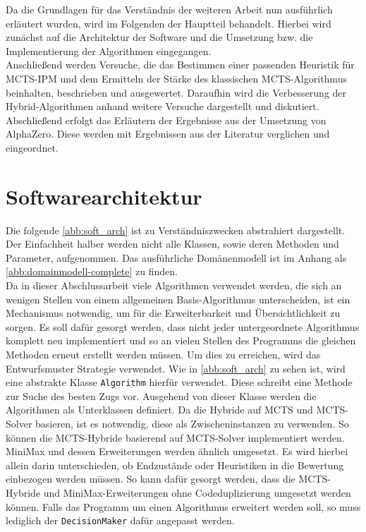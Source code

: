 \documentclass[12pt,a4paper,bibliography=totocnumbered,listof=totocnumbered]{article}
\begin{document}
Da die Grundlagen für das Verständnis der weiteren Arbeit nun ausführlich erläutert wurden, wird im Folgenden der Hauptteil behandelt. Hierbei wird zunächst auf die Architektur der Software und die Umsetzung bzw. die Implementierung der Algorithmen eingegangen.\\Anschließend werden Versuche, die das Bestimmen einer passenden Heuristik für MCTS-IPM und dem Ermitteln der Stärke des klassischen MCTS-Algorithmus beinhalten, beschrieben und ausgewertet. Daraufhin wird die Verbesserung der Hybrid-Algorithmen anhand weitere Versuche dargestellt und diskutiert.\\Abschließend erfolgt das Erläutern der Ergebnisse aus der Umsetzung von AlphaZero. Diese werden mit Ergebnissen aus der Literatur verglichen und eingeordnet.
\pagebreak
\section{Softwarearchitektur} \label{sec:softwarearch}
Die folgende \autoref{abb:soft_arch} ist zu Verständniszwecken abstrahiert dargestellt. Der Einfachheit halber werden nicht alle Klassen, sowie deren Methoden und Parameter, aufgenommen. Das ausführliche Domänenmodell ist im Anhang als \autoref{abb:domainmodell-complete} zu finden.\\
Da in dieser Abschlussarbeit viele Algorithmen verwendet werden, die sich an wenigen Stellen von einem allgemeinen Basis-Algorithmus unterscheiden, ist ein Mechanismus notwendig, um für die Erweiterbarkeit und Übersichtlichkeit zu sorgen. Es soll dafür gesorgt werden, dass nicht jeder untergeordnete Algorithmus komplett neu implementiert und so an vielen Stellen des Programms die gleichen Methoden erneut erstellt werden müssen. Um dies zu erreichen, wird das Entwurfsmuster Strategie verwendet. Wie in \autoref{abb:soft_arch} zu sehen ist, wird eine abstrakte Klasse \texttt{Algorithm} hierfür verwendet. Diese schreibt eine Methode zur Suche des besten Zugs vor. Ausgehend von dieser Klasse werden die Algorithmen als Unterklassen definiert. Da die Hybride auf MCTS und MCTS-Solver basieren, ist es notwendig, diese als Zwischeninstanzen zu verwenden. So können die MCTS-Hybride basierend auf MCTS-Solver implementiert werden. MiniMax und dessen Erweiterungen werden ähnlich umgesetzt. Es wird hierbei allein darin unterschieden, ob Endzustände oder Heuristiken in die Bewertung einbezogen werden müssen. So kann dafür gesorgt werden, dass die MCTS-Hybride und MiniMax-Erweiterungen ohne Codeduplizierung umgesetzt werden können. Falls das Programm um einen Algorithmus erweitert werden soll, so muss lediglich der \texttt{DecisionMaker} dafür angepasst werden.\\ \\
\end{document}
